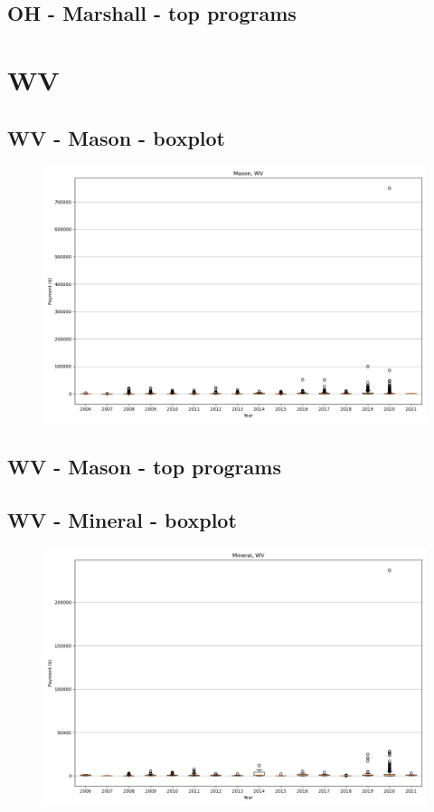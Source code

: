 \subsection*{OH - Marshall - top programs}

\newpage
\section*{WV}
\subsection*{WV - Mason - boxplot}
\begin{figure}[h]
\centering
\includegraphics[width=7in]{../output/boxplots/counties/Mason-WV_boxplot.png}
\end{figure}


\subsection*{WV - Mason - top programs}

\newpage
\subsection*{WV - Mineral - boxplot}
\begin{figure}[h]
\centering
\includegraphics[width=7in]{../output/boxplots/counties/Mineral-WV_boxplot.png}
\end{figure}


